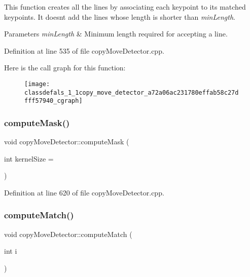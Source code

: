 This function creates all the lines by associating each keypoint to its matched keypoints. It doesn\textquotesingle{}t add the lines whose length is shorter than {\itshape min\+Length}.


\begin{DoxyParams}{Parameters}
{\em min\+Length} & Minimum length required for accepting a line. \\
\hline
\end{DoxyParams}


Definition at line 535 of file copy\+Move\+Detector.\+cpp.

Here is the call graph for this function\+:\nopagebreak
\begin{figure}[H]
\begin{center}
\leavevmode
\texttt{[image: classdefals\_1\_1copy\_move\_detector\_a72a06ac231780effab58c27dfff57940\_cgraph]}
\end{center}
\end{figure}
\mbox{\label{classdefals_1_1copy_move_detector_a2ba4bcb4cd0f752c84ceb411052d1117}} 
\subsubsection{\texorpdfstring{compute\+Mask()}{computeMask()}}
{\footnotesize\ttfamily void copy\+Move\+Detector\+::compute\+Mask (\begin{DoxyParamCaption}\item[{int}]{kernel\+Size = {} }\end{DoxyParamCaption})\hspace{0.3cm}{\ttfamily [private]}}



Definition at line 620 of file copy\+Move\+Detector.\+cpp.

\mbox{\label{classdefals_1_1copy_move_detector_a43c24f4f6cf44f291da75733d2441ffe}} 
\subsubsection{\texorpdfstring{compute\+Match()}{computeMatch()}}
{\footnotesize\ttfamily void copy\+Move\+Detector\+::compute\+Match (\begin{DoxyParamCaption}\item[{int}]{i }\end{DoxyParamCaption})\hspace{0.3cm}{\ttfamily [private]}}

